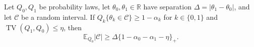 Let \(Q_0,Q_1\) be probability laws, let \(\theta_0,\theta_1\in\mathbb R\) have separation \(\Delta=|\theta_1-\theta_0|\), and let \(\mathcal C\) be a random interval. If \(Q_k\{\theta_k\in\mathcal C\}\ge1-\alpha_k\) for \(k\in\{0,1\}\) and \(\operatorname{TV}(Q_1,Q_0)\le\eta\), then \[\mathbb E_{Q_0}|\mathcal C|\ge\Delta\{1-\alpha_0-\alpha_1-\eta\}_+.\]